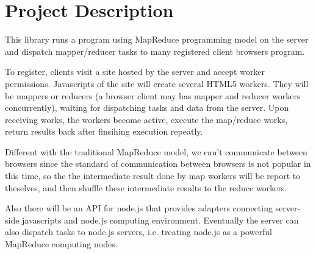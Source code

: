 \section{Project Description}

This library runs a program using MapReduce programming model on the server and dispatch mapper/reducer tasks to many registered client browsers program.

To register, clients visit a site hosted by the server and accept worker permissions. Javascripts of the site will create several HTML5 workers. They will be mappers or reducers (a browser client may has mapper and reducer workers concurrently), waiting for dispatching tasks and data from the server. Upon receiving works, the workers become active, execute the map/reduce works, return results back after finsihing execution repeatly.

Different with the traditional MapReduce model, we can’t communicate between browsers since the standard of communication between browsers is not popular in this time, so the the intermediate result done by map workers will be report to theselves, and then shuffle these intermediate results to the reduce workers.

Also there will be an API for node.js that provides adapters connecting server-side javascripts and node.js computing environment. Eventually the server can also dispatch tasks to node.js servers, i.e. treating node.js as a powerful MapReduce computing nodes.